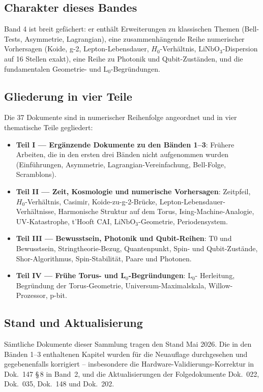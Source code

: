 \subsection*{Charakter dieses Bandes}

Band 4 ist breit gefächert: er enthält Erweiterungen zu klassischen Themen
(Bell-Tests, Asymmetrie, Lagrangian), eine zusammenhängende Reihe numerischer
Vorhersagen (Koide, g-2, Lepton-Lebensdauer, $H_0$-Verhältnis,
$\mathrm{LiNbO}_3$-Dispersion auf 16 Stellen exakt), eine Reihe zu Photonik
und Qubit-Zuständen, und die fundamentalen Geometrie- und L$_0$-Begründungen.

\subsection*{Gliederung in vier Teile}

Die 37 Dokumente sind in numerischer Reihenfolge angeordnet und in vier
thematische Teile gegliedert:

\begin{itemize}
\item \textbf{Teil I --- Ergänzende Dokumente zu den Bänden 1--3}: Frühere
      Arbeiten, die in den ersten drei Bänden nicht aufgenommen wurden
      (Einführungen, Asymmetrie, Lagrangian-Vereinfachung, Bell-Folge,
      Scramblons).
\item \textbf{Teil II --- Zeit, Kosmologie und numerische Vorhersagen}:
      Zeitpfeil, $H_0$-Verhältnis, Casimir, Koide-zu-g-2-Brücke,
      Lepton-Lebensdauer-Verhältnisse, Harmonische Struktur auf dem Torus,
      Ising-Machine-Analogie, UV-Katastrophe, t'Hooft CAI,
      $\mathrm{LiNbO}_3$-Geometrie, Periodensystem.
\item \textbf{Teil III --- Bewusstsein, Photonik und Qubit-Reihen}: T0 und
      Bewusstsein, Stringtheorie-Bezug, Quantenpunkt, Spin- und
      Qubit-Zustände, Shor-Algorithmus, Spin-Stabilität, Paare und Photonen.
\item \textbf{Teil IV --- Frühe Torus- und L$_0$-Begründungen}: L$_0$-
      Herleitung, Begründung der Torus-Geometrie, Universum-Maximalskala,
      Willow-Prozessor, p-bit.
\end{itemize}

\subsection*{Stand und Aktualisierung}

Sämtliche Dokumente dieser Sammlung tragen den Stand Mai 2026. Die in den
Bänden 1--3 enthaltenen Kapitel wurden für die Neuauflage durchgesehen und
gegebenenfalls korrigiert -- insbesondere die Hardware-Validierungs-Korrektur
in Dok.~147 §\,8 in Band~2, und die Aktualisierungen der Folgedokumente
Dok.~022, Dok.~035, Dok.~148 und Dok.~202.
